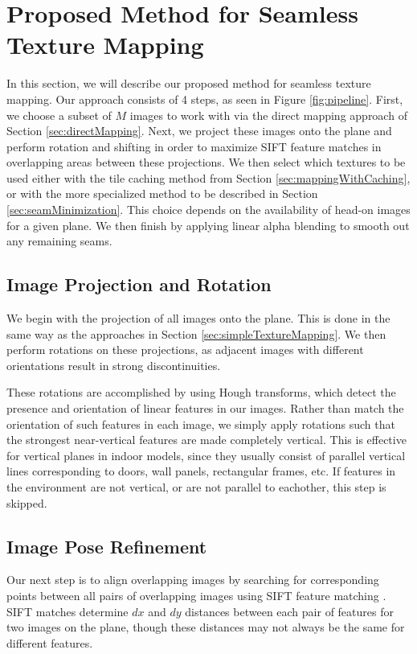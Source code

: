 \documentclass[10pt,twocolumn,letterpaper]{article}
\begin{document}
\section{Proposed Method for Seamless Texture Mapping}
\label{sec:proposedApproach}
In this section, we will describe our proposed method for seamless
texture mapping. Our approach consists of 4 steps, as seen in Figure
\ref{fig:pipeline}.  First, we choose a subset of $M$ images to work
with via the direct mapping approach of Section
\ref{sec:directMapping}. Next, we project these images onto the plane
and perform rotation and shifting in order to maximize SIFT feature
matches in overlapping areas between these projections. We then select
which textures to be used either with the tile caching method from
Section \ref{sec:mappingWithCaching}, or with the more specialized
method to be described in Section \ref{sec:seamMinimization}. This
choice depends on the availability of head-on images for a given
plane. We then finish by applying linear alpha blending to smooth out
any remaining seams.

\subsection{Image Projection and Rotation}
\label{sec:projectionAndRotation}
We begin with the projection of all images onto the plane. This is
done in the same way as the approaches in Section
\ref{sec:simpleTextureMapping}. We then perform rotations on these
projections, as adjacent images with different orientations result in
strong discontinuities.

These rotations are accomplished by using Hough transforms, which
detect the presence and orientation of linear features in our
images. Rather than match the orientation of such features in each
image, we simply apply rotations such that the strongest near-vertical
features are made completely vertical. This is effective for vertical
planes in indoor models, since they usually consist of parallel
vertical lines corresponding to doors, wall panels, rectangular
frames, etc. If features in the environment are not vertical, or are
not parallel to eachother, this step is skipped.


\subsection{Image Pose Refinement}
\label{sec:robustSIFTFeatureMatching}
Our next step is to align overlapping images by searching for
corresponding points between all pairs of overlapping images using
SIFT feature matching \cite{lowe1999object}. SIFT matches
determine $dx$ and $dy$ distances between each pair of features for
two images on the plane, though these distances may not always be the
same for different features.
\end{document}
